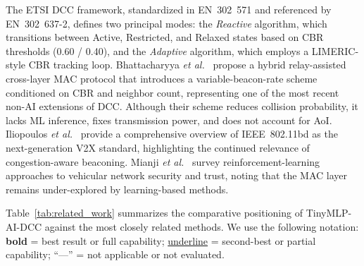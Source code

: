 \documentclass[journal]{IEEEtran}
\begin{document}
The ETSI DCC framework, standardized in EN~302~571 and referenced by
EN~302~637-2, defines two principal modes: the \emph{Reactive}
algorithm, which transitions between Active, Restricted, and Relaxed
states based on CBR thresholds (0.60 / 0.40), and the
\emph{Adaptive} algorithm, which employs a LIMERIC-style CBR tracking
loop.  Bhattacharyya \emph{et al.}~\cite{Bhattacharyya2024} propose a
hybrid relay-assisted cross-layer MAC protocol that introduces a
variable-beacon-rate scheme conditioned on CBR and neighbor count,
representing one of the most recent non-AI extensions of DCC.
Although their scheme reduces collision probability, it lacks ML
inference, fixes transmission power, and does not account for AoI.
Iliopoulos \emph{et al.}~\cite{Iliopoulos2025} provide a comprehensive
overview of IEEE~802.11bd as the next-generation V2X standard,
highlighting the continued relevance of congestion-aware beaconing.
Mianji \emph{et al.}~\cite{Mianji2025} survey reinforcement-learning
approaches to vehicular network security and trust, noting that the
MAC layer remains under-explored by learning-based methods.

Table~\ref{tab:related_work} summarizes the comparative positioning of
TinyMLP-AI-DCC against the most closely related methods.  We use the
following notation: \textbf{bold} = best result or full capability;
\underline{underline} = second-best or partial capability; ``---'' =
not applicable or not evaluated.
\end{document}
